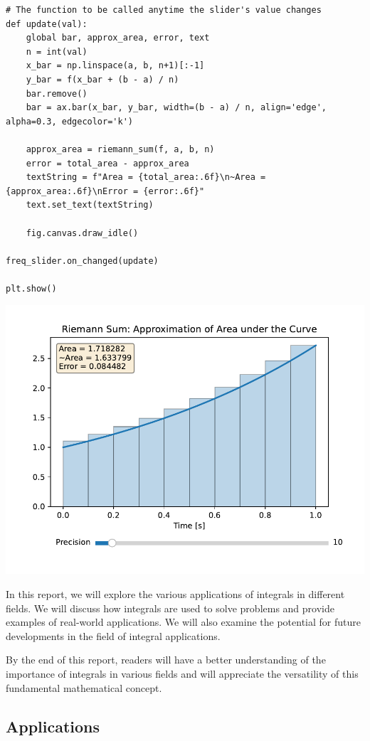 \documentclass[13pt,a4paper]{report}
\begin{document}
\begin{verbatim}
# The function to be called anytime the slider's value changes
def update(val):
    global bar, approx_area, error, text
    n = int(val)
    x_bar = np.linspace(a, b, n+1)[:-1]
    y_bar = f(x_bar + (b - a) / n)
    bar.remove()
    bar = ax.bar(x_bar, y_bar, width=(b - a) / n, align='edge', alpha=0.3, edgecolor='k')

    approx_area = riemann_sum(f, a, b, n)
    error = total_area - approx_area
    textString = f"Area = {total_area:.6f}\n~Area = {approx_area:.6f}\nError = {error:.6f}"
    text.set_text(textString)

    fig.canvas.draw_idle()

freq_slider.on_changed(update)

plt.show()
\end{verbatim}

\includegraphics[trim={0.5cm 0.75cm 0 0.5cm},clip]{pdfs/riemann_sum.pdf}

In this report, we will explore the various applications of integrals in different fields. We will discuss how integrals are used to solve problems and provide examples of real-world applications. We will also examine the potential for future developments in the field of integral applications.

By the end of this report, readers will have a better understanding of the importance of integrals in various fields and will appreciate the versatility of this fundamental mathematical concept.

\newpage
\subsection{Applications}
\end{document}
